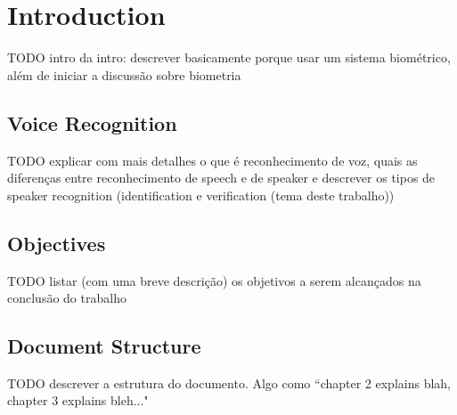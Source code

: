 \chapter{Introduction}

TODO intro da intro: descrever basicamente porque usar um sistema biométrico, além de iniciar a discussão sobre biometria

\section{Voice Recognition}

TODO explicar com mais detalhes o que é reconhecimento de voz, quais as diferenças entre reconhecimento de speech e de speaker e descrever os tipos de speaker recognition (identification e verification (tema deste trabalho))

\section{Objectives}

TODO listar (com uma breve descrição) os objetivos a serem alcançados na conclusão do trabalho

\section{Document Structure}

TODO descrever a estrutura do documento. Algo como ``chapter 2 explains blah, chapter 3 explains bleh..."